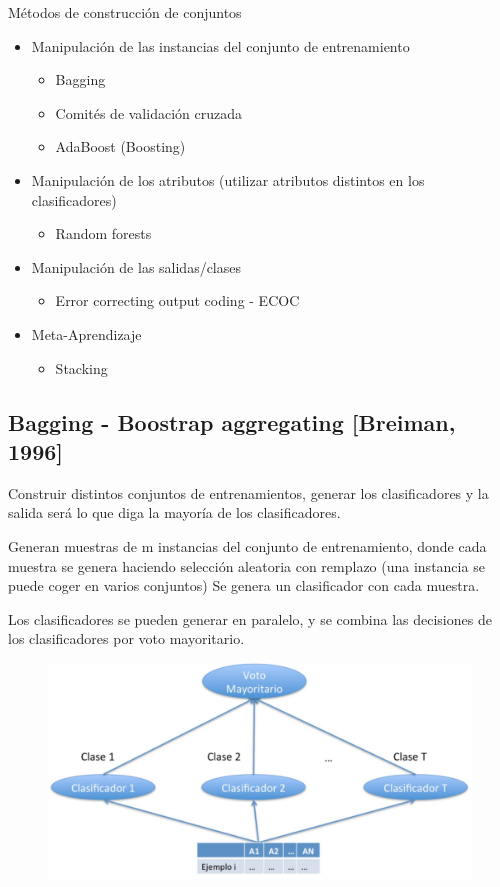 \documentclass[12pt]{report} %
\begin{document}
Métodos de construcción de conjuntos
\begin{itemize}
  \item Manipulación de las instancias del conjunto de entrenamiento
  \begin{itemize}
    \item Bagging
    \item Comités de validación cruzada
    \item AdaBoost (Boosting)
  \end{itemize}
  \item Manipulación de los atributos (utilizar atributos distintos en los clasificadores)
  \begin{itemize}
    \item Random forests
  \end{itemize}
  \item Manipulación de las salidas/clases
  \begin{itemize}
    \item Error correcting output coding - ECOC
  \end{itemize}
  \item Meta-Aprendizaje
  \begin{itemize}
    \item Stacking
  \end{itemize}
\end{itemize}

\subsection{Bagging - Boostrap aggregating [Breiman, 1996]}
Construir distintos conjuntos de entrenamientos, generar los clasificadores y la salida será lo que diga la mayoría de los clasificadores.

Generan muestras de m instancias del conjunto de entrenamiento, donde cada muestra se genera haciendo selección aleatoria con remplazo (una instancia se puede coger en varios conjuntos) Se genera un clasificador con cada muestra.

Los clasificadores se pueden generar en paralelo, y se combina las decisiones de los clasificadores por voto mayoritario.

\begin{figure}[H]
  {\includegraphics[scale=.3]{2021-04-09 23_26_39-Settings.png}}
\end{figure}
\end{document}
